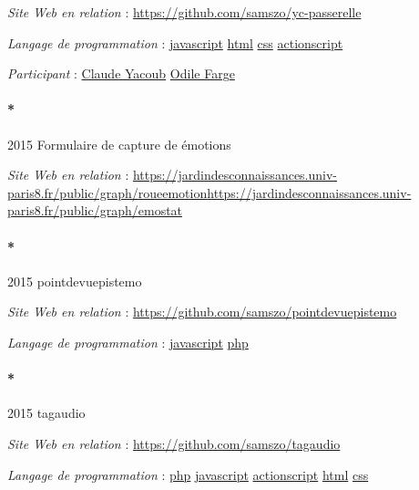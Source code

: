 \documentclass[
  a4paper,
  DIV=11,
  numbers=noendperiod]{scrreprt}
\let\oldparagraph\paragraph
\renewcommand{\paragraph}[1]{\oldparagraph{#1}\mbox{}}
\begin{document}
\emph{Site Web en relation} :
\url{https://github.com/samszo/yc-passerelle}

\emph{Langage de programmation} :
\href{http://localhost/samszo/omk/s/fiches/item/89711}{javascript}
\href{http://localhost/samszo/omk/s/fiches/item/96621}{html}
\href{http://localhost/samszo/omk/s/fiches/item/102418}{css}
\href{http://localhost/samszo/omk/s/fiches/item/158736}{actionscript}

\emph{Participant} :
\href{http://localhost/samszo/omk/s/fiches/item/61424}{Claude Yacoub}
\href{http://localhost/samszo/omk/s/fiches/item/62343}{Odile Farge}

\paragraph*{2015 Formulaire de capture de
émotions}\label{formulaire-de-capture-de-uxe9motions}

\emph{Site Web en relation} :
\url{https://jardindesconnaissances.univ-paris8.fr/public/graph/roueemotion}\url{https://jardindesconnaissances.univ-paris8.fr/public/graph/emostat}

\paragraph*{2015 pointdevuepistemo}\label{sec-item301785}

\emph{Site Web en relation} :
\url{https://github.com/samszo/pointdevuepistemo}

\emph{Langage de programmation} :
\href{http://localhost/samszo/omk/s/fiches/item/89711}{javascript}
\href{http://localhost/samszo/omk/s/fiches/item/108369}{php}

\paragraph*{2015 tagaudio}\label{sec-item301790}

\emph{Site Web en relation} : \url{https://github.com/samszo/tagaudio}

\emph{Langage de programmation} :
\href{http://localhost/samszo/omk/s/fiches/item/108369}{php}
\href{http://localhost/samszo/omk/s/fiches/item/89711}{javascript}
\href{http://localhost/samszo/omk/s/fiches/item/158736}{actionscript}
\href{http://localhost/samszo/omk/s/fiches/item/96621}{html}
\href{http://localhost/samszo/omk/s/fiches/item/102418}{css}
\end{document}
